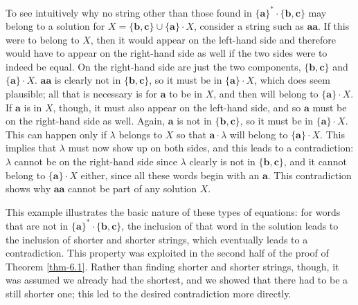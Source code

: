 To see intuitively why no string other than those found in $\{\pmb{a}\}^*\cdot
\{\pmb{b},\pmb{c}\}$ may belong to a solution for $X=\{\pmb{b},\pmb{c}\}\cup\{
\pmb{a}\}\cdot X$, consider a string such as $\pmb{aa}$. If this were to belong to
$X$, then it would appear on the left-hand side and therefore would have to
appear on the right-hand side as well if the two sides were to indeed be equal.
On the right-hand side are just the two components, $\{\pmb{b},\pmb{c}\}$ and
$\{\pmb{a}\}\cdot X$. $\pmb{aa}$ is clearly not in $\{\pmb{b},\pmb{c}\}$, so it
must be in $\{\pmb{a}\}\cdot X$, which does seem plausible; all that is
necessary is for $\pmb{a}$ to be in $X$, and then  will belong to $\{\pmb{a}\}
\cdot X$. If $\pmb{a}$ is in $X$, though, it must also appear on the left-hand
side, and so $\pmb{a}$ must be on the right-hand side as well. Again, $\pmb{a}$ is
not in $\{\pmb{b},\pmb{c}\}$, so it must be in $\{\pmb{a}\}\cdot X$. This can
happen only if $\lambda$ belongs to $X$ so that $\pmb{a}\cdot\lambda$ will
belong to $\{\pmb{a}\}\cdot X$. This implies that $\lambda$ must now show up on
both sides, and this leads to a contradiction: $\lambda$ cannot be on the
right-hand side since $\lambda$ clearly is not in $\{\pmb{b},\pmb{c}\}$, and it
cannot belong to $\{\pmb{a}\}\cdot X$ either, since all these words begin with
an $\pmb{a}$. This contradiction shows why $\pmb{aa}$ cannot be part of any solution
$X$.

This example illustrates the basic nature of these types of equations: for words
that are not in $\{\pmb{a}\}^*  \cdot\{\pmb{b},\pmb{c}\}$, the inclusion of that
word in the solution leads to the inclusion of shorter and shorter strings,
which eventually leads to a contradiction. This property was exploited in the
second half of the proof of Theorem \ref{thm-6.1}. Rather than finding shorter and shorter
strings, though, it was assumed we already had the shortest, and we showed that
there had to be a still shorter one; this led to the desired contradiction more
directly.

